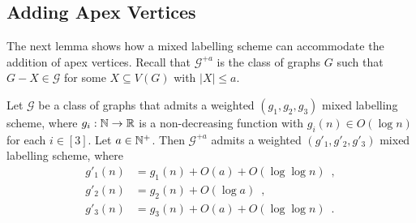 \documentclass{patmorin}
\renewcommand{\leq}{\leqslant}
\newcommand{\Oh}{O}
\begin{document}
\subsection{Adding Apex Vertices}
\label{sec:adding_apexes}

The next lemma shows how a mixed labelling scheme can accommodate the addition of apex vertices. Recall that $\mathcal{G}^{+a}$ is the class of graphs $G$ such that $G-X\in\mathcal{G}$ for some $X\subseteq V(G)$ with $|X|\leq a$.

\begin{lem}\label{add_apexes}
  Let $\mathcal{G}$ be a class of graphs that admits a weighted $(g_1,g_2,g_3)$ mixed labelling scheme, where $g_i:\mathbb{N}\to\mathbb{R}$ is a non-decreasing function  with $g_i(n)\in \Oh(\log n)$ for each $i\in[3]$.
  Let $a\in\mathbb{N}^+$. Then $\mathcal{G}^{+a}$ admits a weighted $(g'_1,g'_2,g'_3)$ mixed labelling scheme, where
  \begin{align*}
    g'_1(n)
     & = g_1(n)+\Oh(a)+\Oh(\log\log n) \enspace,  \\
    g'_2(n)
     & = g_2(n)+\Oh(\log a) \enspace,             \\
    g'_3(n)
     & = g_3(n)+\Oh(a)+\Oh(\log\log n) \enspace .
  \end{align*}
\end{lem}
\end{document}

